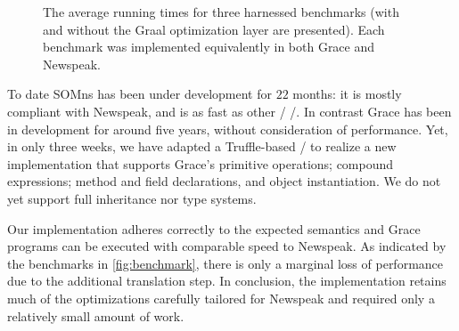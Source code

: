 \begin{figure}
    \centering
    \makebox[\columnwidth][c]{
        \resizebox{\columnwidth}{!}{
            
        }
    }
    \caption{The average running times for three harnessed benchmarks (with and without the Graal optimization layer are presented). Each benchmark was implemented equivalently in both Grace and Newspeak. }
    \label{fig:benchmark}
\end{figure}


To date SOMns has been under development for $22$ months: it is mostly compliant with Newspeak, and is as fast as other \JITing/ \vms/. In contrast Grace has been in development for around five years, without consideration of performance. Yet, in only three weeks, we have adapted a Truffle-based \vm/ to realize a new implementation that supports Grace's primitive operations; compound expressions; method and field declarations, and object instantiation. We do not yet support full inheritance nor type systems.

Our implementation adheres correctly to the expected semantics and Grace programs can be executed with comparable speed to Newspeak. As indicated by the benchmarks in \autoref{fig:benchmark}, there is only a marginal loss of performance due to the additional translation step. In conclusion, the implementation retains much of the optimizations carefully tailored for Newspeak and required only a relatively small amount of work.



